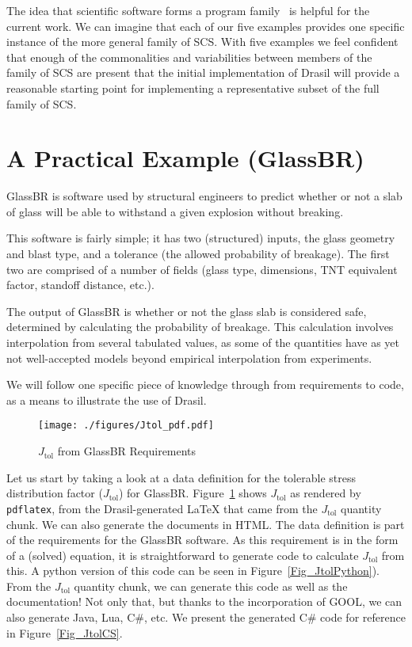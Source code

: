 \documentclass[sigconf]{acmart}
\newcommand{\jtol}{$J_{\mbox{tol}}$}
\begin{document}
The idea that scientific software forms a program
family~\cite{SmithMcCutchanAndCao2007} is helpful for the current work.  We can
imagine that each of our five examples provides one specific instance of the
more general family of SCS.  With five examples we feel confident that enough of
the commonalities and variabilities between members of the family of SCS are
present that the initial implementation of Drasil will provide a reasonable
starting point for implementing a representative subset of the full family of
SCS.

\section{A Practical Example (GlassBR)} \label{SecGlassBR}

GlassBR is software used by structural engineers to predict whether or 
not a slab of glass will be able to withstand a given explosion without
breaking.  

This software is fairly simple; it has two (structured) inputs, the 
glass geometry and blast type, and a tolerance (the allowed probability
of breakage). The first two are comprised of
a number of fields (glass type, dimensions, TNT equivalent factor, 
standoff distance, etc.).

The output of GlassBR is whether or not the glass slab is considered safe,
determined by calculating the probability of breakage.  This calculation involves
interpolation from several tabulated values, as some of the quantities have
as yet not well-accepted models beyond empirical interpolation from experiments.

We will follow one specific piece of knowledge through from requirements to
code, as a means to illustrate the use of Drasil.

\begin{figure}
\begin{center}
\texttt{[image: ./figures/Jtol\_pdf.pdf]}
\end{center}
\caption{\jtol{} from GlassBR Requirements}
\label{Fig_Jtolpdf}
\end{figure}

Let us start by taking a look at a data definition for the tolerable stress
distribution factor (\jtol{}) for GlassBR. Figure~\ref{Fig_Jtolpdf} shows
\jtol{} as rendered by \texttt{pdflatex}, from the Drasil-generated \LaTeX 
that came from the \jtol{} quantity chunk. We can also generate the documents
in HTML. The data definition is part of the requirements for the GlassBR
software.  As this requirement is in the form of a (solved) equation, it is
straightforward to generate code to
calculate \jtol{} from this.  A python version of this code can be seen in
Figure~\ref{Fig_JtolPython}). From the \jtol{} quantity chunk, we can generate
this code as well as the documentation!  Not only that, but thanks to the
incorporation of GOOL, we can also generate Java, Lua, C\#, etc. We present
the generated C\# code for reference in Figure~\ref{Fig_JtolCS}.
\end{document}
